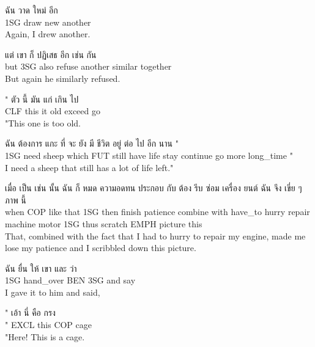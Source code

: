 \documentclass{book}
\begin{document}
	\begin{exe}
		\ex 
		\gll ฉัน วาด ใหม่ อีก\\
		\textsc{1SG} draw new another\\
		Again, I drew another.
	\end{exe}

	\begin{exe}
		\ex 
		\gll แต่ เขา ก็ ปฏิเสธ อีก เช่น กัน\\
		but \textsc{3SG} also refuse another similar together\\
		But again he similarly refused.
	\end{exe}

	\begin{exe}
		\ex 
		\gll " ตัว นี้ มัน แก่ เกิน ไป\\
		\textsc{CLF} this it old exceed go\\
		"This one is too old.
	\end{exe}

	\begin{exe}
		\ex 
		\gll ฉัน ต้องการ แกะ ที่ จะ ยัง มี ชีวิต อยู่ ต่อ ไป อีก นาน "\\
		\textsc{1SG} need sheep which \textsc{FUT} still have life stay continue go more long\_time "\\
		I need a sheep that still has a lot of life left."
	\end{exe}

	\begin{exe}
		\ex 
		\gll เมื่อ เป็น เช่น นั้น ฉัน ก็ หมด ความอดทน ประกอบ กับ ต้อง รีบ ซ่อม เครื่อง ยนต์ ฉัน จึง เขี่ย ๆ ภาพ นี้\\
		when \textsc{COP} like that \textsc{1SG} then finish patience combine with have\_to hurry repair machine motor \textsc{1SG} thus scratch \textsc{EMPH} picture this\\
		That, combined with the fact that I had to hurry to repair my engine, made me lose my patience and I scribbled down this picture.
	\end{exe}

	\begin{exe}
		\ex 
		\gll ฉัน ยื่น ให้ เขา และ ว่า\\
		\textsc{1SG} hand\_over \textsc{BEN} \textsc{3SG} and say\\
		I gave it to him and said,
	\end{exe}

	\begin{exe}
		\ex 
		\gll " เอ้า นี่ คือ กรง\\
		" \textsc{EXCL} this \textsc{COP} cage\\
		"Here! This is a cage.
	\end{exe}
\end{document}
